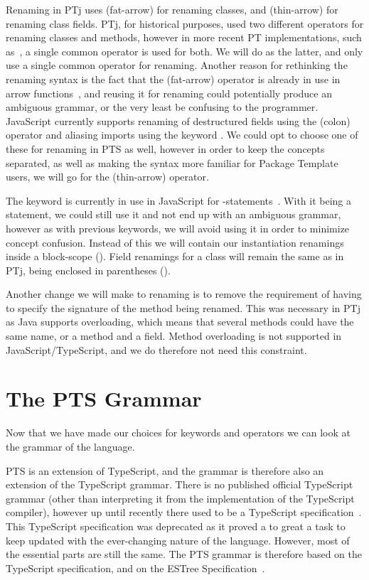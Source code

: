 Renaming in PTj uses \codeword{=>}(fat-arrow) for renaming classes, and \codeword{->}(thin-arrow) for renaming class fields.
PTj, for historical purposes, used two different operators for renaming classes and methods, however in more recent PT implementations, such as~\cite{Isene2018}, a single common operator is used for both.
We will do as the latter, and only use a single common operator for renaming.
Another reason for rethinking the renaming syntax is the fact that the \codeword{=>}(fat-arrow) operator is already in use in arrow functions~\cite{arrowfunction}, and reusing it for renaming could potentially produce an ambiguous grammar, or the very least be confusing to the programmer.
JavaScript currently supports renaming of destructured fields using the \codeword{:}(colon) operator and aliasing imports using the keyword .
We could opt to choose one of these for renaming in PTS as well, however in order to keep the concepts separated, as well as making the syntax more familiar for Package Template users, we will go for the \codeword{->}(thin-arrow) operator.

The  keyword is currently in use in JavaScript for -statements~\cite{with-statement}.
With it being a statement, we could still use it and not end up with an ambiguous grammar, however as with previous keywords, we will avoid using it in order to minimize concept confusion.
Instead of this we will contain our instantiation renamings inside a block-scope (\codeword{\{ \}}).
Field renamings for a class will remain the same as in PTj, being enclosed in parentheses (\codeword{( )}).

Another change we will make to renaming is to remove the requirement of having to specify the signature of the method being renamed.
This was necessary in PTj as Java supports overloading, which means that several methods could have the same name, or a method and a field.
Method overloading is not supported in JavaScript/TypeScript, and we do therefore not need this constraint.

\section{The PTS Grammar}\label{sec:the-pts-grammar}

Now that we have made our choices for keywords and operators we can look at the grammar of the language.

PTS is an extension of TypeScript, and the grammar is therefore also an extension of the TypeScript grammar.
There is no published official TypeScript grammar (other than interpreting it from the implementation of the TypeScript compiler), however up until recently there used to be a TypeScript specification~\cite{tsspec}.
This TypeScript specification was deprecated as it proved a to great a task to keep updated with the ever-changing nature of the language.
However, most of the essential parts are still the same.
The PTS grammar is therefore based on the TypeScript specification, and on the ESTree Specification~\cite{estreespec}.

